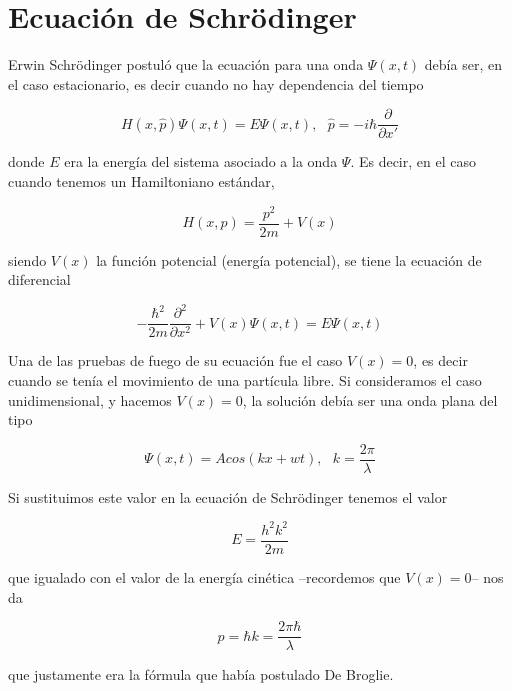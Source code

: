 \section{Ecuaci\'on de Schr\"odinger}
Erwin Schr\"odinger postul\'o que la ecuaci\'on para una onda $\Psi(x,t) $
deb\'ia ser, en el caso estacionario, es decir cuando no hay dependencia del
tiempo

\begin{equation*}
	H(x, \widehat{p}) \Psi(x,t) = E \Psi(x,t), \ \ \ 
	\widehat{p}=-i\hbar\frac{\partial}{\partial x '}
\end{equation*}

donde $E$ era la energ\'ia del sistema asociado a la onda $\Psi$. Es decir, en el
caso cuando tenemos un Hamiltoniano est\'andar,

\begin{equation*}
	H(x,p)=\frac{p^2}{2m}+V(x)
\end{equation*}

siendo $V(x)$ la funci\'on potencial (energ\'ia potencial), se tiene la ecuaci\'on de diferencial

\begin{equation}
	-\frac{\hbar^2}{2m} \frac{\partial^2}{\partial x^2} + V(x) \Psi(x,t) = E\Psi(x,t)
	\label{schrodinger_eq_3}
\end{equation}

Una de las pruebas de fuego de su ecuaci\'on fue el caso $V(x)=0$, es decir cuando se ten\'ia el
movimiento de una part\'icula libre. Si consideramos el caso unidimensional, y hacemos $V (x) = 0$,
la soluci\'on deb\'ia ser una onda plana del tipo

\begin{equation*}
	\Psi(x,t)=A cos(kx+wt), \ \ \ 
	k=\frac{2\pi}{\lambda}
\end{equation*}

Si sustituimos este valor en la ecuaci\'on de Schr\"odinger tenemos el valor

\begin{equation*}
	E=\frac{h^2 k^2}{2m}
\end{equation*}

que igualado con el valor de la energ\'ia cin\'etica --recordemos que $V(x)=0$-- nos da

\begin{equation*}
	p=\hbar k = \frac{2 \pi \hbar}{\lambda}
\end{equation*}

que justamente era la f\'ormula que hab\'ia postulado De Broglie.


